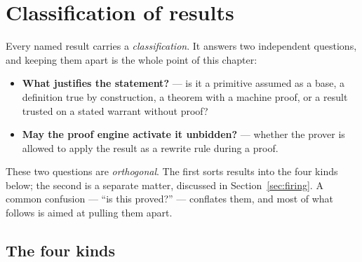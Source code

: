 \chapter{Classification of results}
\label{ch:classification}

Every named result carries a \emph{classification}.
It answers two independent questions, and keeping them apart is the whole
point of this chapter:

\begin{itemize}
\item \textbf{What justifies the statement?} --- is it a primitive
  assumed as a base, a definition true by construction, a theorem with a
  machine proof, or a result trusted on a stated warrant without proof?
\item \textbf{May the proof engine activate it unbidden?} --- whether the
  prover is allowed to apply the result as a rewrite rule during a proof.
\end{itemize}

\noindent
These two questions are \emph{orthogonal}.  The first sorts results into
the four kinds below; the second is a separate matter, discussed in
Section~\ref{sec:firing}.  A common confusion --- ``is this proved?'' ---
conflates them, and most of what follows is aimed at pulling them apart.

\section{The four kinds}
\label{sec:four-kinds}

